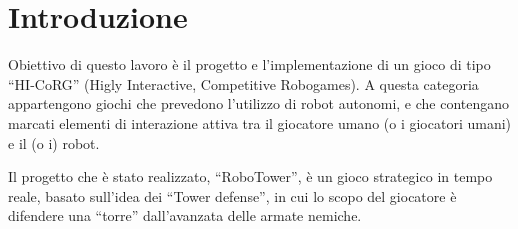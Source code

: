 \chapter{Introduzione}
\label{cap:introduzione}

Obiettivo di questo lavoro è il progetto e l'implementazione di un gioco di tipo ``HI-CoRG'' (Higly Interactive, Competitive Robogames). A questa categoria appartengono giochi che prevedono l'utilizzo di robot autonomi, e che contengano marcati elementi di interazione attiva tra il giocatore umano (o i giocatori umani) e il (o i) robot.

Il progetto che è stato realizzato, ``RoboTower'', è un gioco strategico in tempo reale, basato sull'idea dei ``Tower defense'', in cui lo scopo del giocatore è difendere una ``torre'' dall'avanzata delle armate nemiche.